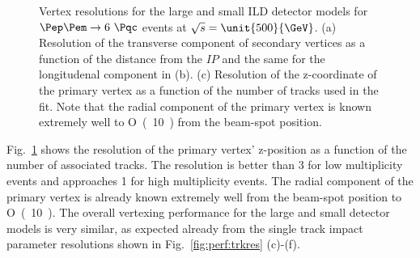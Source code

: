 \begin{figure}[htbp]
\begin{subfigure}{0.49\hsize}
 \caption{  \label{fig:perf:pvtx_z}}
 \end{subfigure}
\caption{ Vertex resolutions for the large and small ILD detector models for  $\Pep\Pem \rightarrow 6~\Pqc$ events at $\sqrt{s}=\unit{500}{\GeV}$.
  (a) Resolution of the transverse component of secondary vertices as a function of the distance from the $IP$ and the same for the longitudenal component in (b).
  (c) Resolution of the z-coordinate of the primary vertex as a function of the number of tracks used in the fit. 
  Note that the radial component of the primary vertex is known extremely well to \unit{O(10)}{\nm} from the beam-spot position.
}
\label{fig:perf:vtxres}
\end{figure}
%
Fig.~\ref{fig:perf:pvtx_z} shows the resolution of the primary vertex' z-position as a function of the number of associated tracks.
The resolution is better than \unit{3}{\micron} for low multiplicity events and
approaches \unit{1}{\micron} for high multiplicity events.  The radial component of the primary vertex is already known
extremely well from the beam-spot position to \unit{O(10)}{\nm}. The overall vertexing performance for the large and small detector models
is very similar, as expected already from the single track impact parameter resolutions shown in Fig.~\ref{fig:perf:trkres} (c)-(f).



